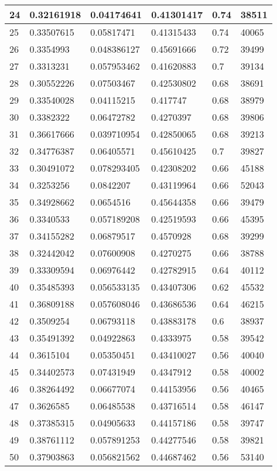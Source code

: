 \begin{longtable}{|l|l|l|l|l|l|}
24 & 0.32161918 & 0.04174641 & 0.41301417 & 0.74 & 38511 \\ \hline 
25 & 0.33507615 & 0.05817471 & 0.41315433 & 0.74 & 40065 \\ \hline 
26 & 0.3354993 & 0.048386127 & 0.45691666 & 0.72 & 39499 \\ \hline 
27 & 0.3313231 & 0.057953462 & 0.41620883 & 0.7 & 39134 \\ \hline 
28 & 0.30552226 & 0.07503467 & 0.42530802 & 0.68 & 38691 \\ \hline 
29 & 0.33540028 & 0.04115215 & 0.417747 & 0.68 & 38979 \\ \hline 
30 & 0.3382322 & 0.06472782 & 0.4270397 & 0.68 & 39806 \\ \hline 
31 & 0.36617666 & 0.039710954 & 0.42850065 & 0.68 & 39213 \\ \hline 
32 & 0.34776387 & 0.06405571 & 0.45610425 & 0.7 & 39827 \\ \hline 
33 & 0.30491072 & 0.078293405 & 0.42308202 & 0.66 & 45188 \\ \hline 
34 & 0.3253256 & 0.0842207 & 0.43119964 & 0.66 & 52043 \\ \hline 
35 & 0.34928662 & 0.0654516 & 0.45644358 & 0.66 & 39479 \\ \hline 
36 & 0.3340533 & 0.057189208 & 0.42519593 & 0.66 & 45395 \\ \hline 
37 & 0.34155282 & 0.06879517 & 0.4570928 & 0.68 & 39299 \\ \hline 
38 & 0.32442042 & 0.07600908 & 0.4270275 & 0.66 & 38788 \\ \hline 
39 & 0.33309594 & 0.06976442 & 0.42782915 & 0.64 & 40112 \\ \hline 
40 & 0.35485393 & 0.056533135 & 0.43407306 & 0.62 & 45532 \\ \hline 
41 & 0.36809188 & 0.057608046 & 0.43686536 & 0.64 & 46215 \\ \hline 
42 & 0.3509254 & 0.06793118 & 0.43883178 & 0.6 & 38937 \\ \hline 
43 & 0.35491392 & 0.04922863 & 0.4333975 & 0.58 & 39542 \\ \hline 
44 & 0.3615104 & 0.05350451 & 0.43410027 & 0.56 & 40040 \\ \hline 
45 & 0.34402573 & 0.07431949 & 0.4347912 & 0.58 & 40002 \\ \hline 
46 & 0.38264492 & 0.06677074 & 0.44153956 & 0.56 & 40465 \\ \hline 
47 & 0.3626585 & 0.06485538 & 0.43716514 & 0.58 & 46147 \\ \hline 
48 & 0.37385315 & 0.04905633 & 0.44157186 & 0.58 & 39747 \\ \hline 
49 & 0.38761112 & 0.057891253 & 0.44277546 & 0.58 & 39821 \\ \hline 
50 & 0.37903863 & 0.056821562 & 0.44687462 & 0.56 & 53140 \\ \hline 
\end{longtable}